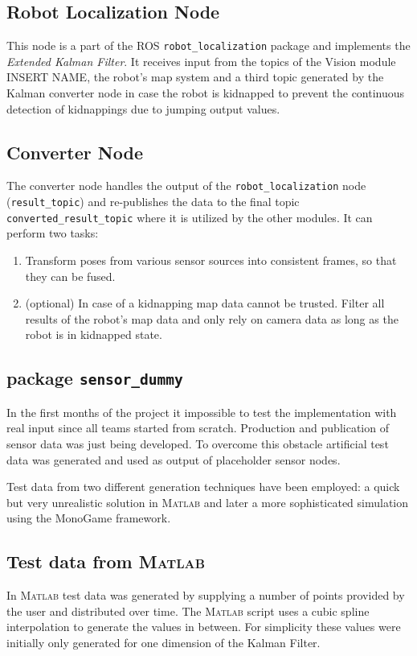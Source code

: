 \subsection{Robot Localization Node}
This node is a part of the ROS \texttt{robot\_localization} package and implements the \textit{Extended Kalman Filter}. It receives input from the topics of the Vision module INSERT NAME, the robot's map system and a third topic generated by the Kalman converter node in case the robot is kidnapped to prevent the continuous detection of kidnappings due to jumping output values.

\subsection{Converter Node}
The converter node handles the output of the \texttt{robot\_localization} node (\texttt{result\_topic}) and re-publishes the data to the final topic \texttt{converted\_result\_topic} where it is utilized by the other modules. It can perform two tasks:

\begin{enumerate}
\item Transform poses from various sensor sources into consistent frames, so that they can be fused.
\item (optional) In case of a kidnapping map data cannot be trusted. Filter all results of the robot's map data and only rely on camera data as long as the robot is in kidnapped state.
\end{enumerate}

\subsection{package \texttt{sensor\_dummy}}
In the first months of the project it impossible to test the implementation with real input since all teams started from scratch. Production and publication of sensor data was just being developed. To overcome this obstacle artificial test data was generated and used as output of placeholder sensor nodes. 

Test data from two different generation techniques have been employed: a quick but very unrealistic solution in \textsc{Matlab} and later a more sophisticated simulation using the MonoGame framework.

\subsection{Test data from \textsc{Matlab}}
In \textsc{Matlab} test data was generated by supplying a number of points provided by the user and distributed over time. The \textsc{Matlab} script uses a cubic spline interpolation to generate the values in between. For simplicity these values were initially only generated for one dimension of the Kalman Filter.

